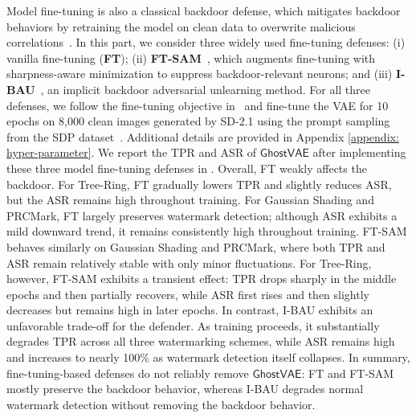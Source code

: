\documentclass[letterpaper,twocolumn,10pt]{article}
\newcommand{\mg}{$\mathsf{GhostVAE}$\xspace}
\newcommand{\mypara}[1]{\smallskip\noindent{\bf {#1}.} \xspace}
\begin{document}
\mypara{Model Fine-tuning}
Model fine-tuning is also a classical backdoor defense, which mitigates backdoor behaviors by retraining the model on clean data to overwrite malicious correlations~\cite{DBLP:conf/nips/MinQ0C23,DBLP:conf/iclr/XuH0Q024}.
In this part, we consider three widely used fine-tuning defenses:
(i) vanilla fine-tuning (\textbf{FT});
(ii) \textbf{FT-SAM}~\cite{DBLP:conf/iccv/ZhuW0FW23}, which augments fine-tuning with sharpness-aware minimization to suppress backdoor-relevant neurons; and
(iii) \textbf{I-BAU}~\cite{DBLP:conf/iclr/ZengCPM0J22}, an implicit backdoor adversarial unlearning method.
For all three defenses, we follow the fine-tuning objective in~\cite{Rombach2021HighResolutionIS} and fine-tune the VAE for 10 epochs on 8,000 clean images generated by SD-2.1 using the prompt sampling from the SDP dataset~\cite{gustavosta_sd_prompts}.
Additional details are provided in Appendix \ref{appendix: hyper-parameter}.
We report the TPR and ASR of \mg after implementing these three model fine-tuning defenses in .
Overall, FT weakly affects the backdoor.
For Tree-Ring, FT gradually lowers TPR and slightly reduces ASR, but the ASR remains high throughout training. 
For Gaussian Shading and PRCMark, FT largely preserves watermark detection; although ASR exhibits a mild downward trend, it remains consistently high throughout training.
FT-SAM behaves similarly on Gaussian Shading and PRCMark, where both TPR and ASR remain relatively stable with only minor fluctuations. 
For Tree-Ring, however, FT-SAM exhibits a transient effect: TPR drops sharply in the middle epochs and then partially recovers, while ASR first rises and then slightly decreases but remains high in later epochs. 
In contrast, I-BAU exhibits an unfavorable trade-off for the defender. 
As training proceeds, it substantially degrades TPR across all three watermarking schemes, while ASR remains high and increases to nearly 100\% as watermark detection itself collapses.
In summary, fine-tuning-based defenses do not reliably remove \mg: FT and FT-SAM mostly preserve the backdoor behavior, whereas I-BAU degrades normal watermark detection without removing the backdoor behavior.
\end{document}
